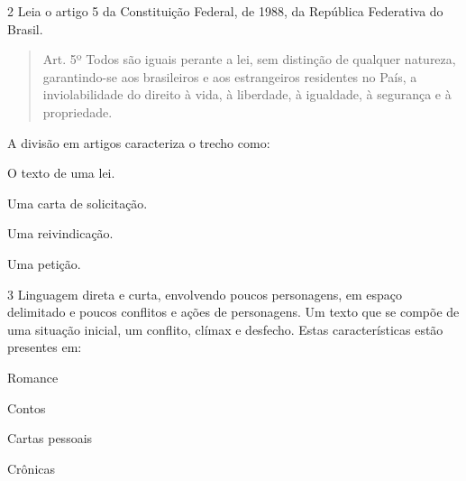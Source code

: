 \num{2} Leia o artigo 5 da Constituição Federal, de 1988, da República
Federativa do Brasil.

\begin{quote}

Art. 5º Todos são iguais perante a lei, sem distinção de qualquer
natureza, garantindo-se aos brasileiros e aos estrangeiros residentes no
País, a inviolabilidade do direito à vida, à liberdade, à igualdade, à
segurança e à propriedade.

\end{quote}


A divisão em artigos caracteriza o trecho como:

\begin{escolha}

    \item O texto de uma lei.

    \item Uma carta de solicitação.

    \item Uma reivindicação.

    \item Uma petição.

\end{escolha}

\pagebreak

\num{3} Linguagem direta e curta, envolvendo poucos personagens, em espaço
delimitado e poucos conflitos e ações de personagens. Um texto que se
compõe de uma situação inicial, um conflito, clímax e desfecho. Estas
características estão presentes em:

\begin{escolha}

    \item Romance

    \item Contos

    \item Cartas pessoais

    \item Crônicas

\end{escolha}

